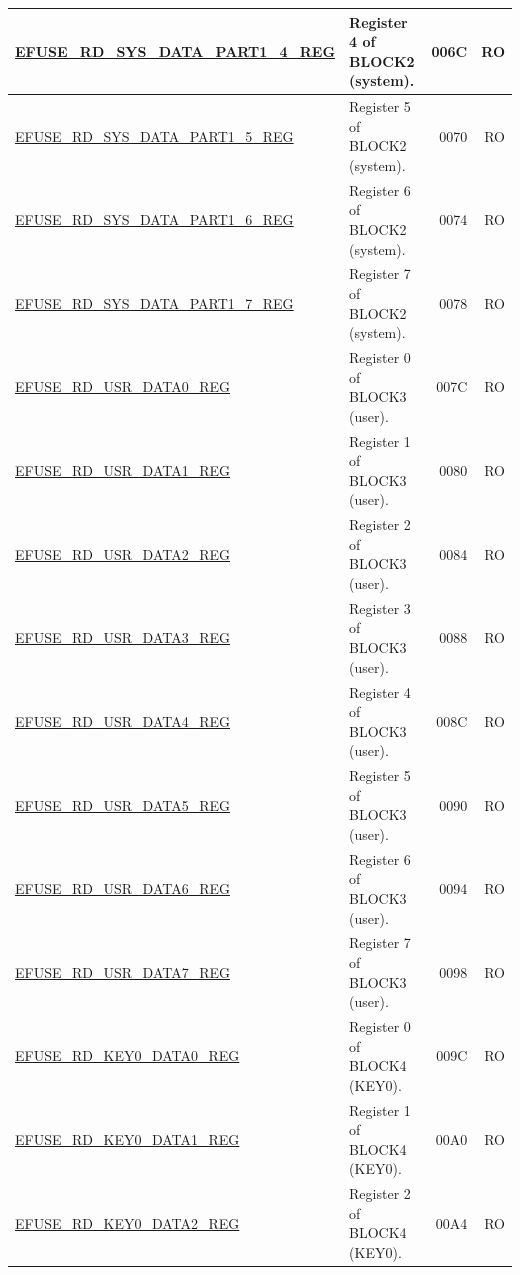 \begin{longtable}{ | m{6cm} | m{7.2cm} | r| r | }
\hyperref[regdesc:EFUSERDSYSDATAPART1DATA4TO7REG]{EFUSE\_RD\_SYS\_DATA\_PART1\_4\_REG} & Register 4 of BLOCK2 (system). & \hexprefix{}006C & RO \\ \hline
\hyperref[regdesc:EFUSERDSYSDATAPART1DATA4TO7REG]{EFUSE\_RD\_SYS\_DATA\_PART1\_5\_REG} & Register 5 of BLOCK2 (system). & \hexprefix{}0070 & RO \\ \hline
\hyperref[regdesc:EFUSERDSYSDATAPART1DATA4TO7REG]{EFUSE\_RD\_SYS\_DATA\_PART1\_6\_REG} & Register 6 of BLOCK2 (system). & \hexprefix{}0074 & RO \\ \hline
\hyperref[regdesc:EFUSERDSYSDATAPART1DATA4TO7REG]{EFUSE\_RD\_SYS\_DATA\_PART1\_7\_REG} & Register 7 of BLOCK2 (system). & \hexprefix{}0078 & RO \\ \hline
\hyperref[regdesc:EFUSERDUSRDATANREG]{EFUSE\_RD\_USR\_DATA0\_REG} & Register 0 of BLOCK3 (user). & \hexprefix{}007C & RO \\ \hline
\hyperref[regdesc:EFUSERDUSRDATANREG]{EFUSE\_RD\_USR\_DATA1\_REG} & Register 1 of BLOCK3 (user). & \hexprefix{}0080 & RO \\ \hline
\hyperref[regdesc:EFUSERDUSRDATANREG]{EFUSE\_RD\_USR\_DATA2\_REG} & Register 2 of BLOCK3 (user). & \hexprefix{}0084 & RO \\ \hline
\hyperref[regdesc:EFUSERDUSRDATANREG]{EFUSE\_RD\_USR\_DATA3\_REG} & Register 3 of BLOCK3 (user). & \hexprefix{}0088 & RO \\ \hline
\hyperref[regdesc:EFUSERDUSRDATANREG]{EFUSE\_RD\_USR\_DATA4\_REG} & Register 4 of BLOCK3 (user). & \hexprefix{}008C & RO \\ \hline
\hyperref[regdesc:EFUSERDUSRDATANREG]{EFUSE\_RD\_USR\_DATA5\_REG} & Register 5 of BLOCK3 (user). & \hexprefix{}0090 & RO \\ \hline
\hyperref[regdesc:EFUSERDUSRDATANREG]{EFUSE\_RD\_USR\_DATA6\_REG} & Register 6 of BLOCK3 (user). & \hexprefix{}0094 & RO \\ \hline
\hyperref[regdesc:EFUSERDUSRDATANREG]{EFUSE\_RD\_USR\_DATA7\_REG} & Register 7 of BLOCK3 (user). & \hexprefix{}0098 & RO \\ \hline
\hyperref[regdesc:EFUSERDKEY0DATANREG]{EFUSE\_RD\_KEY0\_DATA0\_REG} & Register 0 of BLOCK4 (KEY0). & \hexprefix{}009C & RO \\ \hline
\hyperref[regdesc:EFUSERDKEY0DATANREG]{EFUSE\_RD\_KEY0\_DATA1\_REG} & Register 1 of BLOCK4 (KEY0). & \hexprefix{}00A0 & RO \\ \hline
\hyperref[regdesc:EFUSERDKEY0DATANREG]{EFUSE\_RD\_KEY0\_DATA2\_REG} & Register 2 of BLOCK4 (KEY0). & \hexprefix{}00A4 & RO \\ \hline

\end{longtable}
